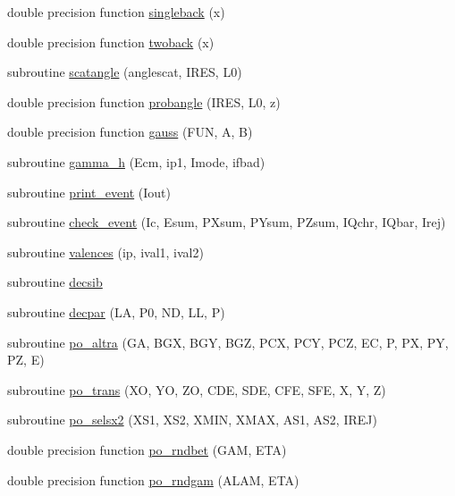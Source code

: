 \begin{DoxyCompactItemize}
\item 
double precision function \hyperlink{sophia_8f_a3e9c601e3b3287dd92907cd27246bcbd}{singleback} (x)
\item 
double precision function \hyperlink{sophia_8f_a4deb51d3df1be9320d285099ba47c9f2}{twoback} (x)
\item 
subroutine \hyperlink{sophia_8f_a418495cd6ce7360591246a1ee9b038c1}{scatangle} (anglescat, I\+R\+E\+S, L0)
\item 
double precision function \hyperlink{sophia_8f_a159ac1bbac5e0c396a90500617a127f6}{probangle} (I\+R\+E\+S, L0, z)
\item 
double precision function \hyperlink{sophia_8f_ab8d754cb468247243ac67fb277bd3ba6}{gauss} (F\+U\+N, A, B)
\item 
subroutine \hyperlink{sophia_8f_a221b6a8bd8c7cc596f7e8dd65c606dac}{gamma\+\_\+h} (Ecm, ip1, Imode, ifbad)
\item 
subroutine \hyperlink{sophia_8f_a4dba7b185d8bae723bb5b14a71766036}{print\+\_\+event} (Iout)
\item 
subroutine \hyperlink{sophia_8f_aba3e49e88d500c8ca82839c874166cfb}{check\+\_\+event} (Ic, Esum, P\+Xsum, P\+Ysum, P\+Zsum, I\+Qchr, I\+Qbar, Irej)
\item 
subroutine \hyperlink{sophia_8f_a7fd31ea25664e20b0469471449b57915}{valences} (ip, ival1, ival2)
\item 
subroutine \hyperlink{sophia_8f_a0992e3777708845cc43933feef2f520a}{decsib}
\item 
subroutine \hyperlink{sophia_8f_a9e00005d1f5d0ef7dbe87b5fc90f5091}{decpar} (L\+A, P0, N\+D, L\+L, P)
\item 
subroutine \hyperlink{sophia_8f_a17bed582d215cdca12ce6acc9110151e}{po\+\_\+altra} (G\+A, B\+G\+X, B\+G\+Y, B\+G\+Z, P\+C\+X, P\+C\+Y, P\+C\+Z, E\+C, P, P\+X, P\+Y, P\+Z, E)
\item 
subroutine \hyperlink{sophia_8f_a90b3d826e619542e912c7540e0122f44}{po\+\_\+trans} (X\+O, Y\+O, Z\+O, C\+D\+E, S\+D\+E, C\+F\+E, S\+F\+E, X, Y, Z)
\item 
subroutine \hyperlink{sophia_8f_a83ddf78a90c35295d600702e51711056}{po\+\_\+selsx2} (X\+S1, X\+S2, X\+M\+I\+N, X\+M\+A\+X, A\+S1, A\+S2, I\+R\+E\+J)
\item 
double precision function \hyperlink{sophia_8f_a9362b6e86899866a31cb99e284e6668c}{po\+\_\+rndbet} (G\+A\+M, E\+T\+A)
\item 
double precision function \hyperlink{sophia_8f_af30a5e7351ea97fc265bbf22a0e99b8e}{po\+\_\+rndgam} (A\+L\+A\+M, E\+T\+A)
\item 

\end{DoxyCompactItemize}
